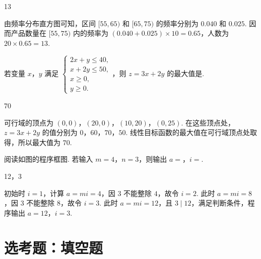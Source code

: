 \begin{answer}
13
\end{answer}

\begin{solution}
由频率分布直方图可知，区间 \([55,65)\) 和 \([65,75)\) 的频率分别为 \(0.040\) 和 \(0.025\). 因而产品数量在 \([55,75)\) 内的频率为 \((0.040+0.025)\times10=0.65\)，人数为 \(20\times0.65=13\).
\end{solution}

\begin{problem}
若变量 \(x\)，\(y\) 满足 \(\begin{cases}
2x + y \leqslant 40,\\
x + 2y \leqslant 50,\\
x \geqslant 0,\\
y \geqslant 0.
\end{cases}\)，则 \(z = 3x + 2y\) 的最大值是\fillinblank{}.
\end{problem}

\begin{answer}
70
\end{answer}

\begin{solution}
可行域的顶点为 \((0,0)\)，\((20,0)\)，\((10,20)\)，\((0,25)\). 在这些顶点处，\(z=3x+2y\) 的值分别为 \(0\)，\(60\)，\(70\)，\(50\). 线性目标函数的最大值在可行域顶点处取得，所以最大值为 \(70\).
\end{solution}

\begin{problem}
阅读如图的程序框图. 若输入 \(m = 4\)，\(n = 3\)，则输出 \(a =\)\fillinblank{}，\(i =\)\fillinblank{}.

\end{problem}

\begin{answer}
12，3
\end{answer}

\begin{solution}
初始时 \(i=1\)，计算 \(a=mi=4\)，因 \(3\) 不能整除 \(4\)，故令 \(i=2\). 此时 \(a=mi=8\)，因 \(3\) 不能整除 \(8\)，故令 \(i=3\). 此时 \(a=mi=12\)，且 \(3\mid12\)，满足判断条件，程序输出 \(a=12\)，\(i=3\).
\end{solution}

\section{选考题：填空题}

